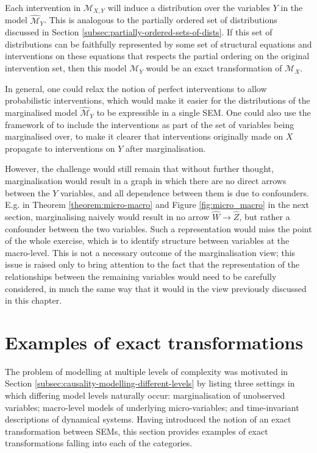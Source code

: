 Each intervention in $\mathcal{M}_{X,Y}$ will induce a distribution over the variables $Y$ in the model $\widehat{\mathcal{M}}_Y$.
This is analogous to the partially ordered set of distributions discussed in Section \ref{subsec:partially-ordered-sets-of-dists}. 
If this set of distributions can be faithfully represented by some set of structural equations and interventions on these equations that respects the partial ordering on the original intervention set, then this model $\mathcal{M}_Y$ would be an exact transformation of $\mathcal{M}_X$.

In general, one could relax the notion of perfect interventions to allow probabilistic interventions, which would make it easier for the distributions of the marginalised model $\widehat{\mathcal{M}}_Y$ to be expressible in a single SEM. 
One could also use the framework of \cite{dawid2020decision} to include the interventions as part of the set of variables being marginalised over, to make it clearer that interventions originally made on $X$ propagate to interventions on $Y$ after marginalisation.

However, the challenge would still remain that without further thought, marginalisation would result in a graph in which there are no direct arrows between the $Y$ variables, and all dependence between them is due to confounders. 
E.g. in Theorem \ref{theorem:micro-macro} and Figure \ref{fig:micro_macro} in the next section, marginalising naively would result in no arrow $\widehat{W} \rightarrow \widehat{Z}$, but rather a confounder between the two variables. 
Such a representation would miss the point of the whole exercise, which is to identify structure between variables at the macro-level.
This is not a necessary outcome of the marginalisation view; this issue is raised only to bring attention to the fact that the representation of the relationships between the remaining variables would need to be carefully considered, in much the same way that it would in the view previously discussed in this chapter.


\section{Examples of exact transformations}\label{sec:causality-causal-examples-of-transformations}

The problem of modelling at multiple levels of complexity was motivated in Section \ref{subsec:causality-modelling-different-levels} by listing three settings in which differing model levels naturally occur: marginalisation of unobserved variables; macro-level models of underlying micro-variables; and time-invariant descriptions of dynamical systems.
Having introduced the notion of an exact transformation between SEMs, this section provides examples of exact transformations falling into each of the categories.

